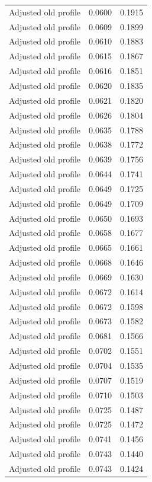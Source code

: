 \begin{table}[htbp]
\begin{tabular}{lll}
Adjusted old profile & 0.0600 & 0.1915 \\
Adjusted old profile & 0.0609 & 0.1899 \\
Adjusted old profile & 0.0610 & 0.1883 \\
Adjusted old profile & 0.0615 & 0.1867 \\
Adjusted old profile & 0.0616 & 0.1851 \\
Adjusted old profile & 0.0620 & 0.1835 \\
Adjusted old profile & 0.0621 & 0.1820 \\
Adjusted old profile & 0.0626 & 0.1804 \\
Adjusted old profile & 0.0635 & 0.1788 \\
Adjusted old profile & 0.0638 & 0.1772 \\
Adjusted old profile & 0.0639 & 0.1756 \\
Adjusted old profile & 0.0644 & 0.1741 \\
Adjusted old profile & 0.0649 & 0.1725 \\
Adjusted old profile & 0.0649 & 0.1709 \\
Adjusted old profile & 0.0650 & 0.1693 \\
Adjusted old profile & 0.0658 & 0.1677 \\
Adjusted old profile & 0.0665 & 0.1661 \\
Adjusted old profile & 0.0668 & 0.1646 \\
Adjusted old profile & 0.0669 & 0.1630 \\
Adjusted old profile & 0.0672 & 0.1614 \\
Adjusted old profile & 0.0672 & 0.1598 \\
Adjusted old profile & 0.0673 & 0.1582 \\
Adjusted old profile & 0.0681 & 0.1566 \\
Adjusted old profile & 0.0702 & 0.1551 \\
Adjusted old profile & 0.0704 & 0.1535 \\
Adjusted old profile & 0.0707 & 0.1519 \\
Adjusted old profile & 0.0710 & 0.1503 \\
Adjusted old profile & 0.0725 & 0.1487 \\
Adjusted old profile & 0.0725 & 0.1472 \\
Adjusted old profile & 0.0741 & 0.1456 \\
Adjusted old profile & 0.0743 & 0.1440 \\
Adjusted old profile & 0.0743 & 0.1424 \\

\end{tabular}
\end{table}
